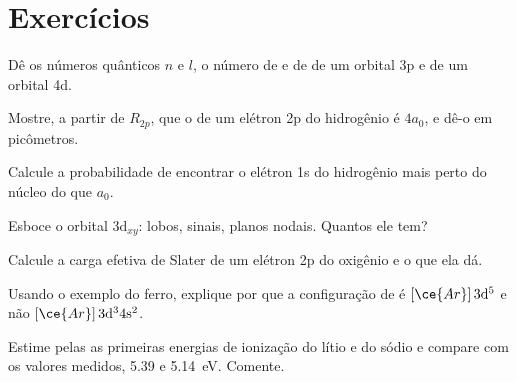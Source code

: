 \section{Exercícios}

\begin{exercise}[$\star$]\label{exo:b2:atomic-orbitals:1}
Dê os números quânticos $n$ e $l$, o número de  e de 
de um orbital 3p e de um orbital 4d.
\end{exercise}

\begin{exercise}[$\star$]\label{exo:b2:atomic-orbitals:2}
Mostre, a partir de $R_{2p}$, que o  de um elétron 2p do
hidrogênio é $4a_0$, e dê-o em picômetros.
\end{exercise}

\begin{exercise}[$\star$]\label{exo:b2:atomic-orbitals:3}
Calcule a probabilidade de encontrar o elétron 1s do hidrogênio mais perto do
núcleo do que $a_0$.
\end{exercise}

\begin{exercise}[$\star$]\label{exo:b2:atomic-orbitals:4}
Esboce o orbital $3\mathrm d_{xy}$: lobos, sinais, planos nodais. Quantos  ele tem?
\end{exercise}

\begin{exercise}[$\star\star$]\label{exo:b2:atomic-orbitals:5}
Calcule a carga efetiva de Slater de um elétron 2p do oxigênio e o  que ela dá.
\end{exercise}

\begin{exercise}[$\star\star$]\label{exo:b2:atomic-orbitals:6}
Usando o exemplo do ferro, explique por que a configuração de  é
$[\ce{Ar}]\,3\mathrm d^5$ e não $[\ce{Ar}]\,3\mathrm d^3 4\mathrm s^2$.
\end{exercise}

\begin{exercise}[$\star\star$]\label{exo:b2:atomic-orbitals:7}
Estime pelas  as primeiras energias de ionização do lítio e do
sódio e compare com os valores medidos, 5.39 e \qty{5.14}{eV}. Comente.
\end{exercise}

